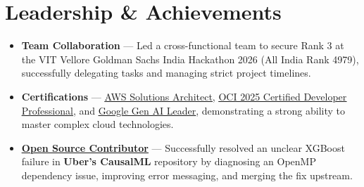 \documentclass[a4paper,10pt]{article}
\newcommand{\ulink}[2]{\href{#1}{\uline{#2}}}
\begin{document}
\vspace{2pt}

\section{Leadership \& Achievements}
\vspace{2pt}
\begin{itemize}[nosep, leftmargin=1.5em, itemsep=1pt, topsep=2pt]
  \item {\color[HTML]{0A0A0A}\fontsize{11}{14}\selectfont \textbf{Team Collaboration} --- Led a cross-functional team to secure Rank 3 at the VIT Vellore Goldman Sachs India Hackathon 2026 (All India Rank 4979), successfully delegating tasks and managing strict project timelines.}
  \item {\color[HTML]{0A0A0A}\fontsize{11}{14}\selectfont \textbf{Certifications} --- \ulink{https://www.credly.com/badges/ee736e9c-48e5-4c68-9531-a910037530d3}{AWS Solutions Architect}, \ulink{https://catalog-education.oracle.com/ords/certview/sharebadge?id=8A188574B53FD87EB9A79BC2A5D51B1F6615D7E7B917A20D727F58032D75AD4A}{OCI 2025 Certified Developer Professional}, and \ulink{https://www.credly.com/badges/b225846a-6eda-43e7-8c19-e016faf8139c}{Google Gen AI Leader}, demonstrating a strong ability to master complex cloud technologies.}
  \item {\color[HTML]{0A0A0A}\fontsize{11}{14}\selectfont \ulink{https://github.com/su-jin1425/My-Open-Source-Contributions}{\textbf{Open Source Contributor}} --- Successfully resolved an unclear XGBoost failure in \textbf{Uber's CausalML} repository by diagnosing an OpenMP dependency issue, improving error messaging, and merging the fix upstream.}
\end{itemize}
\end{document}
